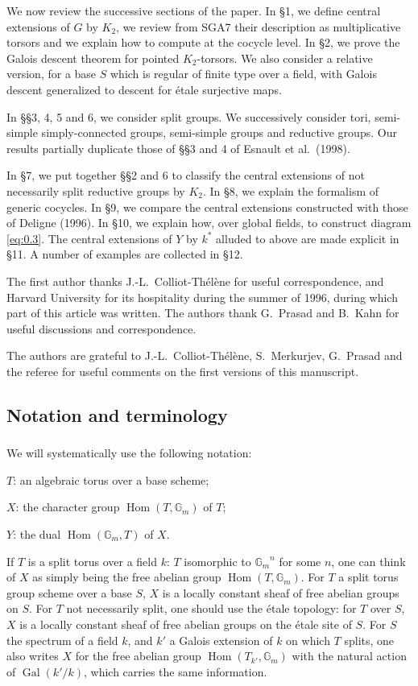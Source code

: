 \documentclass[11pt,a4paper]{article}
\theoremstyle{plain}
\theoremstyle{definition}
\DeclareMathOperator{\Hom}{Hom}
\DeclareMathOperator{\Gal}{Gal}
\newcommand{\Gm}{{\mathbb{G}_m}}
\begin{document}
We now review the successive sections of the paper. In \S 1, we define central extensions of $G$ by $K_2$, we review from SGA7 their description as multiplicative torsors and we explain how to compute at the cocycle level. In \S 2, we prove the Galois descent theorem for pointed $K_2$-torsors. We also consider a relative version, for a base $S$ which is regular of finite type over a field, with Galois descent generalized to descent for \'etale surjective maps.

In \S\S 3, 4, 5 and 6, we consider split groups. We successively consider tori, semi-simple simply-connected groups, semi-simple groups and reductive groups. Our results partially duplicate those of \S\S 3 and 4 of Esnault et al.~(1998).

In \S 7, we put together \S\S 2 and 6 to classify the central extensions of not necessarily split reductive groups by $K_2$. In \S 8, we explain the formalism of generic cocycles. In \S 9, we compare the central extensions constructed with those of Deligne (1996). In \S 10, we explain how, over global fields, to construct diagram \eqref{eq:0.3}. The central extensions of $Y$ by $k^*$ alluded to above are made explicit in \S 11. A number of examples are collected in \S 12.

The first author thanks J.-L.~Colliot-Th\'el\`ene for useful correspondence, and Harvard University for its hospitality during the summer of 1996, during which part of this article was written. The authors thank G.~Prasad and B.~Kahn for useful discussions and correspondence.

The authors are grateful to J.-L.~Colliot-Th\'el\`ene, S.~Merkurjev, G.~Prasad and the referee for useful comments on the first versions of this manuscript.

\subsection{Notation and terminology}

\subsubsection{}
We will systematically use the following notation:

$T$: an algebraic torus over a base scheme;

$X$: the character group $\Hom(T, \Gm)$ of $T$;

$Y$: the dual $\Hom(\Gm, T)$ of $X$.

If $T$ is a split torus over a field $k$: $T$ isomorphic to $\Gm^n$ for some $n$, one can think of $X$ as simply being the free abelian group $\Hom(T, \Gm)$. For $T$ a split torus group scheme over a base $S$, $X$ is a locally constant sheaf of free abelian groups on $S$. For $T$ not necessarily split, one should use the \'etale topology: for $T$ over $S$, $X$ is a locally constant sheaf of free abelian groups on the \'etale site of $S$. For $S$ the spectrum of a field $k$, and $k'$ a Galois extension of $k$ on which $T$ splits, one also writes $X$ for the free abelian group $\Hom(T_{k'}, \Gm)$ with the natural action of $\Gal(k'/k)$, which carries the same information.
\end{document}
